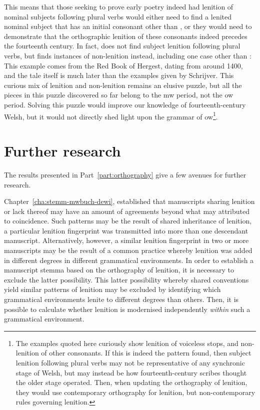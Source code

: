 This means that those seeking to prove early poetry indeed had lenition of nominal subjects following plural verbs would either need to find a lenited nominal subject that has an initial consonant other than , or they would need to demonstrate that the orthographic lenition of these consonants indeed precedes the fourteenth century. In fact, \textcite[65--66]{van_development14} does not find subject lenition following plural verbs, but finds instances of non-lenition instead, including one case other than :
This example comes from the Red Book of Hergest, dating from around 1400, and the tale itself is much later than the examples given by Schrijver. This curious mix of lenition and non-lenition remains an elusive puzzle, but all the pieces in this puzzle discovered so far belong to the \gls{mw} period, not the \gls{ow} period. Solving this puzzle would improve our knowledge of fourteenth-century Welsh, but it would not directly shed light upon the grammar of \gls{ow}\footnote{The examples quoted here curiously show lenition of voiceless stops, and non-lenition of other consonants. If this is indeed the pattern found, then subject lenition following plural verbs may not be representative of any synchronic stage of Welsh, but may instead be how fourteenth-century scribes thought the older stage operated. Then, when updating the orthography of lenition, they would use contemporary orthography for lenition, but non-contemporary rules governing lenition.}.

\section{Further research}
\label{sec:further-research}
The results presented in Part~\ref{part:orthography} give a few avenues for further research.

Chapter~\ref{cha:stemm-mwbuch-dewi}, established that manuscripts sharing lenition or lack thereof may have an amount of agreements beyond what may attributed to coincidence. Such patterns may be the result of shared inheritance of lenition, \ie a particular lenition fingerprint was transmitted into more than one descendant manuscript. Alternatively, however, a similar lenition fingerprint in two or more manuscripts may be the result of a common practice whereby lenition was added in different degrees in different grammatical environments. In order to establish a manuscript stemma based on the orthography of lenition, it is necessary to exclude the latter possibility. This latter possibility whereby shared conventions yield similar patterns of lenition may be excluded by identifying which grammatical environments lenite to different degrees than others. Then, it is possible to calculate whether lenition is modernised independently \emph{within} such a grammatical environment.

